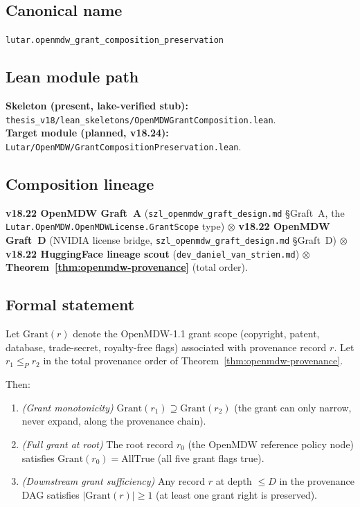 \subsection*{Canonical name}
\verb|lutar.openmdw_grant_composition_preservation|

\subsection*{Lean module path}
\textbf{Skeleton (present, lake-verified stub):}
\texttt{thesis\_v18/lean\_skeletons/OpenMDWGrantComposition.lean}.\\
\textbf{Target module (planned, v18.24):}
\texttt{Lutar/OpenMDW/GrantCompositionPreservation.lean}.

\subsection*{Composition lineage}
\textbf{v18.22 OpenMDW Graft~A}
(\texttt{szl\_openmdw\_graft\_design.md} \S{}Graft~A,
the \texttt{Lutar.OpenMDW.OpenMDWLicense.GrantScope} type) $\otimes$
\textbf{v18.22 OpenMDW Graft~D}
(NVIDIA license bridge,
\texttt{szl\_openmdw\_graft\_design.md} \S{}Graft~D) $\otimes$
\textbf{v18.22 HuggingFace lineage scout}
(\texttt{dev\_daniel\_van\_strien.md}) $\otimes$
\textbf{Theorem~\ref{thm:openmdw-provenance}} (total order).

\subsection*{Formal statement}

\begin{theorem}
\label{thm:openmdw-grant}
Let $\mathrm{Grant}(r)$ denote the OpenMDW-1.1 grant scope
(copyright, patent, database, trade-secret, royalty-free flags)
associated with provenance record $r$.  Let $r_1 \leq_P r_2$ in
the total provenance order of Theorem~\ref{thm:openmdw-provenance}.

Then:
\begin{enumerate}
  \item \emph{(Grant monotonicity)}
        $\mathrm{Grant}(r_1) \supseteq \mathrm{Grant}(r_2)$
        (the grant can only narrow, never expand, along the provenance chain).
  \item \emph{(Full grant at root)}
        The root record $r_0$ (the OpenMDW reference policy node)
        satisfies $\mathrm{Grant}(r_0) = \mathrm{AllTrue}$
        (all five grant flags true).
  \item \emph{(Downstream grant sufficiency)}
        Any record $r$ at depth $\leq D$ in the provenance DAG
        satisfies $|\mathrm{Grant}(r)| \geq 1$
        (at least one grant right is preserved).
\end{enumerate}
\end{theorem}

